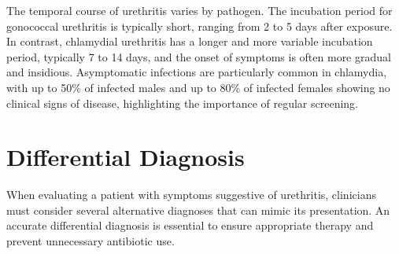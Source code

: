 The temporal course of urethritis varies by pathogen. The incubation period for gonococcal urethritis is typically short, ranging from 2 to 5 days after exposure. In contrast, chlamydial urethritis has a longer and more variable incubation period, typically 7 to 14 days, and the onset of symptoms is often more gradual and insidious. Asymptomatic infections are particularly common in chlamydia, with up to 50\% of infected males and up to 80\% of infected females showing no clinical signs of disease, highlighting the importance of regular screening.

\section*{Differential Diagnosis}
When evaluating a patient with symptoms suggestive of urethritis, clinicians must consider several alternative diagnoses that can mimic its presentation. An accurate differential diagnosis is essential to ensure appropriate therapy and prevent unnecessary antibiotic use.

